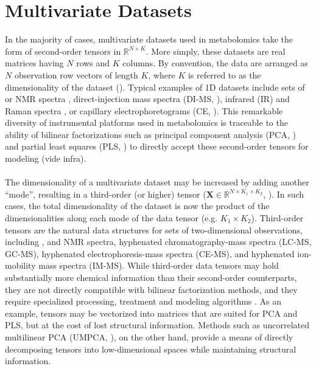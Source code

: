 \section{Multivariate Datasets}

\begin{doublespace}
In the majority of cases, multivariate datasets used in metabolomics take the
form of second-order tensors in $\mathbb{R}^{N \times K}$. More simply, these
datasets are real matrices having $N$ rows and $K$ columns. By convention,
the data are arranged as $N$ observation row vectors of length $K$, where $K$
is referred to as the dimensionality of the dataset ().
Typical examples of 1D datasets include sets of \hnmr{} or \cnmr{} NMR spectra
\cite{beckonert:nprot2007,koh:colon2009}, direct-injection mass spectra
(DI-MS, \cite{castrillo:phch2003,southam:anchem2007,zhou:asms2010}), infrared
(IR) and Raman spectra \cite{ellis:analyst2006,cherney:anchem2007}, or
capillary electrophoretograms (CE, \cite{ramautar:trac2006}). This remarkable
diversity of instrumental platforms used in metabolomics is traceable to the
ability of bilinear factorizations such as principal component analysis
(PCA, \cite{jolliffe2002}) and partial least squares (PLS, \cite{wold1993}) to
directly accept these second-order tensors for modeling (vide infra).
\\\\
The dimensionality of a multivariate dataset may be increased by adding another
``mode'', resulting in a third-order (or higher) tensor
($\mathbf{X} \in \mathbb{R}^{N \times K_1 \times K_2}$,
). In such cases, the total dimensionality of the
dataset is now the product of the dimensionalities along each mode of the
data tensor (e.g. $K_1 \times K_2$). Third-order tensors are the natural
data structures for sets of two-dimensional observations, including
\hhnmr{}, \hcnmr{} and \hnnmr{} NMR spectra, hyphenated chromatography-mass
spectra (LC-MS, GC-MS), hyphenated electrophoresis-mass spectra (CE-MS), and
hyphenated ion-mobility mass spectra (IM-MS). While third-order data tensors
may hold substantially more chemical information than their second-order
counterparts, they are not directly compatible with bilinear factorization
methods, and they require specialized processing, treatment and modeling
algorithms \cite{lu:ieee2009,lu:pr2011}. As an example, tensors may be
vectorized into matrices \cite{hedenstrom:cils2008} that are suited for
PCA and PLS, but at the cost of lost structural information. Methods such
as uncorrelated multilinear PCA (UMPCA, \cite{lu:ieee2009}), on the other
hand, provide a means of directly decomposing tensors into low-dimensional
spaces while maintaining structural information.
\end{doublespace}

